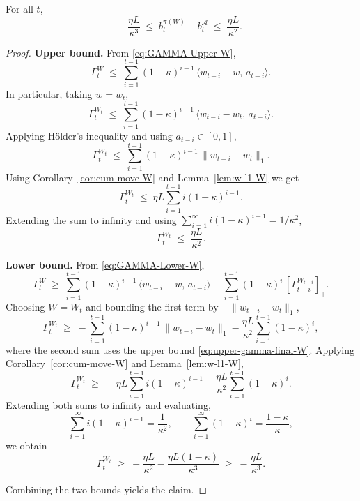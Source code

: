 \begin{Thm:Lemma}
\label{lem:state-gap-bound-W}
For all \(t\),
\[
-\frac{\eta L}{\kappa^3}
\;\leq\;
b_t^{\pi(W)} - b_t^\mathcal{A}
\;\leq\;
\frac{\eta L}{\kappa^2}.
\]
\end{Thm:Lemma}

\begin{proof}
\textbf{Upper bound.}  
From \eqref{eq:GAMMA-Upper-W},
\[
\Gamma_t^{W}
\;\leq\;
\sum_{i=1}^{t-1} (1-\kappa)^{i-1}\,\langle w_{t-i}-w,\,a_{t-i}\rangle .
\]
In particular, taking \(w=w_t\),
\[
\Gamma_t^{W_t}
\;\leq\;
\sum_{i=1}^{t-1} (1-\kappa)^{i-1}\,\langle w_{t-i}-w_t,\,a_{t-i}\rangle .
\]
Applying Hölder’s inequality and using \(a_{t-i}\in[0,1]\),
\[
\Gamma_t^{W_t}
\;\leq\;
\sum_{i=1}^{t-1} (1-\kappa)^{i-1}\,\|w_{t-i}-w_t\|_1 .
\]
Using Corollary~\ref{cor:cum-move-W} and Lemma~\ref{lem:w-l1-W} we get
\[
\Gamma_t^{W_t}
\;\leq\;
\eta L \sum_{i=1}^{t-1} i (1-\kappa)^{i-1}.
\]
Extending the sum to infinity and using \(\sum_{i=1}^\infty i (1-\kappa)^{i-1} = 1/\kappa^2\),
\begin{equation}
\label{eq:upper-gamma-final-W}
\Gamma_t^{W_t}
\;\leq\;
\frac{\eta L}{\kappa^2}.
\end{equation}

\medskip
\noindent
\textbf{Lower bound.}  
From \eqref{eq:GAMMA-Lower-W},
\[
\Gamma_t^W
\;\geq\;
\sum_{i=1}^{t-1} (1-\kappa)^{i-1}\,\langle w_{t-i}-w,\,a_{t-i}\rangle
-\sum_{i=1}^{t-1} (1-\kappa)^i\,[\Gamma_{t-i}^{W_{t-i}}]_+ .
\]
Choosing \(W=W_t\) and bounding the first term by \(-\|w_{t-i}-w_t\|_1\),
\[
\Gamma_t^{W_t}
\;\geq\;
-\sum_{i=1}^{t-1} (1-\kappa)^{i-1}\,\|w_{t-i}-w_t\|_1
-\frac{\eta L}{\kappa^2}\sum_{i=1}^{t-1} (1-\kappa)^i ,
\]
where the second sum uses the upper bound \eqref{eq:upper-gamma-final-W}.  
Applying Corollary~\ref{cor:cum-move-W} and Lemma~\ref{lem:w-l1-W},
\[
\Gamma_t^{W_t}
\;\geq\;
-\eta L \sum_{i=1}^{t-1} i (1-\kappa)^{i-1}
-\frac{\eta L}{\kappa^2}\sum_{i=1}^{t-1}(1-\kappa)^i .
\]
Extending both sums to infinity and evaluating,
\[
\sum_{i=1}^\infty i (1-\kappa)^{i-1} = \frac{1}{\kappa^2}, 
\qquad
\sum_{i=1}^\infty (1-\kappa)^i = \frac{1-\kappa}{\kappa},
\]
we obtain
\[
\Gamma_t^{W_t}
\;\geq\;
-\frac{\eta L}{\kappa^2} - \frac{\eta L(1-\kappa)}{\kappa^3}
\;\geq\;
-\frac{\eta L}{\kappa^3}.
\]

\medskip
\noindent
Combining the two bounds yields the claim.
\end{proof}






